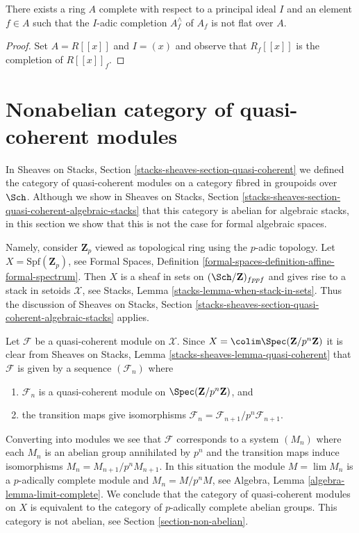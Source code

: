 \begin{lemma}
\label{lemma-nonflat-completion-localization}
There exists a ring $A$ complete with respect to a principal ideal $I$
and an element $f \in A$ such that the $I$-adic completion
$A_f^\wedge$ of $A_f$ is not flat over $A$.
\end{lemma}

\begin{proof}
Set $A = R[[x]]$ and $I = (x)$ and observe that $R_f[[x]]$
is the completion of $R[[x]]_f$.
\end{proof}





\section{Nonabelian category of quasi-coherent modules}
\label{section-nonabelian-QCoh}

\noindent
In Sheaves on Stacks, Section \ref{stacks-sheaves-section-quasi-coherent}
we defined the category of quasi-coherent modules on a category fibred in
groupoids over $\Sch$. Although we show in
Sheaves on Stacks, Section
\ref{stacks-sheaves-section-quasi-coherent-algebraic-stacks}
that this category is abelian for algebraic stacks, in this
section we show that this is not the case for formal algebraic spaces.

\medskip\noindent
Namely, consider $\mathbf{Z}_p$ viewed as topological ring using
the $p$-adic topology. Let $X = \text{Spf}(\mathbf{Z}_p)$, see
Formal Spaces, Definition
\ref{formal-spaces-definition-affine-formal-spectrum}.
Then $X$ is a sheaf in sets on $(\Sch/\mathbf{Z})_{fppf}$
and gives rise to a stack in setoids $\mathcal{X}$, see 
Stacks, Lemma \ref{stacks-lemma-when-stack-in-sets}.
Thus the discussion of Sheaves on Stacks, Section
\ref{stacks-sheaves-section-quasi-coherent-algebraic-stacks}
applies. 

\medskip\noindent
Let $\mathcal{F}$ be a quasi-coherent module on $\mathcal{X}$.
Since $X = \colim \Spec(\mathbf{Z}/p^n\mathbf{Z})$ it is clear from
Sheaves on Stacks, Lemma \ref{stacks-sheaves-lemma-quasi-coherent}
that $\mathcal{F}$ is given by a sequence $(\mathcal{F}_n)$ where
\begin{enumerate}
\item $\mathcal{F}_n$ is a quasi-coherent module on
$\Spec(\mathbf{Z}/p^n\mathbf{Z})$, and
\item the transition maps give isomorphisms
$\mathcal{F}_n = \mathcal{F}_{n + 1}/p^n\mathcal{F}_{n + 1}$.
\end{enumerate}
Converting into modules we see that $\mathcal{F}$ corresponds to a
system $(M_n)$ where each $M_n$ is an abelian group annihilated
by $p^n$ and the transition maps induce isomorphisms
$M_n = M_{n + 1}/p^n M_{n + 1}$. In this situation the module
$M = \lim M_n$ is a $p$-adically complete module and $M_n = M/p^n M$, see
Algebra, Lemma \ref{algebra-lemma-limit-complete}.
We conclude that the category of quasi-coherent modules on $X$
is equivalent to the category of $p$-adically complete
abelian groups. This category is not abelian, see
Section \ref{section-non-abelian}.


